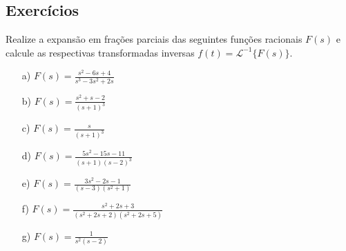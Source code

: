 \subsection*{Exercícios}
\begin{exer}{\label{frac_parciais}} Realize a expansão em frações parciais das seguintes funções racionais $F(s)$ e calcule as respectivas transformadas inversas $f(t)=\mathcal{L}^{-1}\{F(s)\}$.
\begin{itemize}
\item[a)]$F(s)=\frac{s^2-6s+4}{s^3-3s^2+2s}$
\item[b)]$F(s)=\frac{s^2+s-2}{(s+1)^3}$
\item[c)]$F(s)=\frac{s}{(s+1)^3}$
\item[d)]$F(s)=\frac{5s^2-15s-11}{(s+1)(s-2)^3}$
\item[e)]$F(s)=\frac{3s^2-2s-1}{(s-3)(s^2+1)}$
\item[f)]$F(s)=\frac{s^2+2s+3}{(s^2+2s+2)(s^2+2s+5)}$
\item[g)]$F(s)=\frac{1}{s^2(s-2)}$
\end{itemize}
\end{exer}

